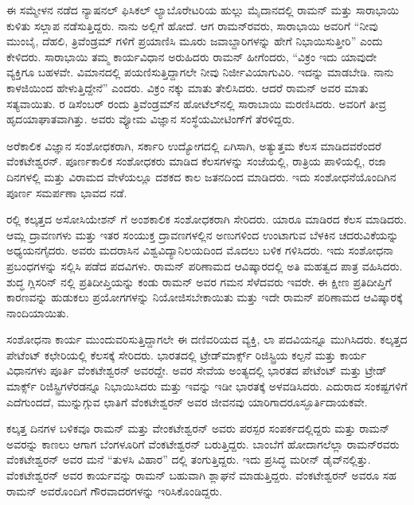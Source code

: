 ಈ ಸಮ್ಮೇಳನ ನಡೆದ ನ್ಯಾಷನಲ್ ಫಿಸಿಕಲ್ ಲ್ಯಾಬೊರೇಟರಿಯ ಹುಲ್ಲು ಮೈದಾನದಲ್ಲಿ ರಾಮನ್ ಮತ್ತು ಸಾರಾಭಾಯಿ ಕುಳಿತು ಸಲ್ಲಾಪ ನಡೆಸುತ್ತಿದ್ದರು. ನಾನು ಅಲ್ಲಿಗೆ ಹೋದೆ. ಆಗ ರಾಮನ್‍ರವರು, ಸಾರಾಭಾಯಿ ಅವರಿಗೆ “ನೀವು ಮುಂಬೈ, ದೆಹಲಿ, ತ್ರಿವೆಂಡ್ರಮ್ ಗಳಿಗೆ ಪ್ರಯಾಣಿಸಿ ಮೂರು ಜವಾಬ್ದಾರಿಗಳನ್ನು ಹೇಗೆ ನಿಭಾಯಿಸುತ್ತೀರಿ” ಎಂದು ಕೇಳಿದರು. ಸಾರಾಭಾಯಿ ತಮ್ಮ ಕಾರ್ಯವಿಧಾನ ಅರುಹಿದರು ರಾಮನ್ ಹೀಗೆಂದರು, “ವಿಕ್ರಂ ಇದು ಯಾವುದೇ ವ್ಯಕ್ತಿಗೂ ಬಹಳವೇ. ವಿಮಾನದಲ್ಲಿ ಪಯಣಿಸುತ್ತಿದ್ದಾಗಲೇ ನೀವು ನಿರ್ಜೀವಿಯಾಗುವಿರಿ. ಇದನ್ನು ಮಾಡಬೇಡಿ. ನಾನು ಕಾಳಜಿಯಿಂದ ಹೇಳುತ್ತಿದ್ದೇನೆ” ಎಂದರು. ವಿಕ್ರಂ ನಕ್ಕು ಮಾತು ತೇಲಿಸಿದರು. ಆದರೆ ರಾಮನ್ ಅವರ ಮಾತು ಸತ್ಯವಾಯಿತು. ರ ಡಿಸೆಂಬರ್ ರಂದು ತ್ರಿವೆಂಡ್ರಮ್‍ನ ಹೋಟೆಲ್‍ನಲ್ಲಿ ಸಾರಾಬಾಯಿ ಮರಣಿಸಿದರು. ಅವರಿಗೆ ತೀವ್ರ ಹೃದಯಾಘಾತವಾಗಿತ್ತು. ಅವರು ವ್ಯೋಮ ವಿಜ್ಞಾನ ಸಂಸ್ಥೆಯ\break ಮೀಟಿಂಗ್‍ಗೆ ತೆರಳಿದ್ದರು.



ಅರೆಕಾಲಿಕ ವಿಜ್ಞಾನ ಸಂಶೋಧಕರಾಗಿ, ಸರ್ಕಾರಿ ಉದ್ಯೋಗದಲ್ಲಿ ಏಗಿಸಾಗಿ, ಅತ್ಯುತ್ತಮ ಕೆಲಸ ಮಾಡಿದವರೆಂದರೆ ವೆಂಕಟೇಶ್ವರನ್. ಪೂರ್ಣಕಾಲಿಕ ಸಂಶೋಧಕರು ಮಾಡಿದ ಕೆಲಸಗಳನ್ನು ಸಂಜೆಯಲ್ಲಿ, ರಾತ್ರಿಯ ಪಾಳಿಯಲ್ಲಿ, ರಜಾ ದಿನಗಳಲ್ಲಿ ಮತ್ತು ವಿರಾಮದ ವೇಳೆಯಲ್ಲೂ ದಶಕದ ಕಾಲ ಜತನದಿಂದ ಮಾಡಿದರು. ಇದು ಸಂಶೋಧನೆಯೊಂದಿಗಿನ ಪೂರ್ಣ ಸಮರ್ಪಣಾ ಭಾವದ ನಡೆ.

ರಲ್ಲಿ ಕಲ್ಕತ್ತದ ಅಸೋಸಿಯೇಶನ್ ಗೆ ಅಂಶಕಾಲಿಕ ಸಂಶೋಧಕರಾಗಿ ಸೇರಿದರು. ಯಾರೂ ಮಾಡಿರದ ಕೆಲಸ ಮಾಡಿದರು. ಆಮ್ಲ ದ್ರಾವಣಗಳು ಮತ್ತು ಇತರ ಸಂಯುಕ್ತ ದ್ರಾವಣಗಳಲ್ಲಿನ ಅಣುಗಳಿಂದ ಉಂಟಾಗುವ ಬೆಳಕಿನ ಚದರುವಿಕೆಯನ್ನು ಅಧ್ಯಯನಗೈದರು. ಅವರು ಮದರಾಸಿನ ವಿಶ್ವವಿದ್ಯಾನಿಲಯದಿಂದ ಮೊದಲು  ಬಳಿಕ  ಗಳಿಸಿದರು. ಇದು ಸಂಶೋಧನಾ ಪ್ರಬಂಧಗಳನ್ನು ಸಲ್ಲಿಸಿ ಪಡೆದ ಪದವಿಗಳು. ರಾಮನ್ ಪರಿಣಾಮದ ಆವಿಷ್ಕಾರದಲ್ಲಿ ಅತಿ ಮಹತ್ವದ ಪಾತ್ರ ವಹಿಸಿದರು. ಶುದ್ಧ ಗ್ಲಿಸರಿನ್ ನಲ್ಲಿ ಪ್ರತಿದೀಪ್ತಿಯನ್ನು ಕಂಡು ರಾಮನ್ ಅವರ ಗಮನ ಸೆಳೆದವರು ಇವರೇ. ಈ ಕ್ಷೀಣ ಪ್ರತಿದೀಪ್ತಿಗೆ ಕಾರಣವನ್ನು ಹುಡುಕಲು ಪ್ರಯೋಗಗಳನ್ನು ನಿಯೋಜಿಸಬೇಕಾಯಿತು ಮತ್ತು ಇದೇ ರಾಮನ್ ಪರಿಣಾಮದ ಆವಿಷ್ಕಾರಕ್ಕೆ ನಾಂದಿಯಾಯಿತು.

ಸಂಶೋಧನಾ ಕಾರ್ಯ ಮುಂದುವರಿಸುತ್ತಿದ್ದಾಗಲೇ ಈ ದಣಿವರಿಯದ ವ್ಯಕ್ತಿ, ಲಾ ಪದವಿ\-ಯನ್ನೂ ಮುಗಿಸಿದರು. ಕಲ್ಕತ್ತದ ಪೇಟೆಂಟ್ ಕಛೇರಿಯಲ್ಲಿ ಕೆಲಸಕ್ಕೆ ಸೇರಿದರು. ಭಾರತದಲ್ಲಿ ಟ್ರೇಡ್‌ಮಾರ್ಕ್ಸ್ ರಿಜಿಸ್ಟ್ರಿಯ ಕಲ್ಪನೆ ಮತ್ತು ಕಾರ್ಯ ವಿಧಾನಗಳು ಪೂರ್ತಿ ವೆಂಕಟೇಶ್ವರನ್ ಅವರದ್ದೇ. ಅವರ ಸೇವೆಯ ಅಂತ್ಯದಲ್ಲಿ ಭಾರತದ ಪೇಟೆಂಟ್ ಮತ್ತು ಟ್ರೇಡ್ ಮಾರ್ಕ್ಸ್ ರಿಜಿಸ್ಟ್ರಿಗಳೆರಡನ್ನೂ ನಿಭಾಯಿಸಿದರು ಮತ್ತು ಇವನ್ನು ಇಡೀ ಭಾರತಕ್ಕೆ ಅಳವಡಿಸಿದರು. ಎದುರಾದ ಸಂಕಷ್ಟಗಳಿಗೆ ಎದೆಗುಂದದೆ, ಮುನ್ನುಗ್ಗುವ ಛಾತಿಗೆ ವೆಂಕಟೇಶ್ವರನ್ ಅವರ ಜೀವನವು ಯಾರಿಗಾದರೂ\break ಸ್ಫೂರ್ತಿದಾಯಕವೇ.

\vskip 2pt

ಕಲ್ಕತ್ತ ದಿನಗಳ ಬಳಿಕವೂ ರಾಮನ್ ಮತ್ತು ವೇಂಕಟೇಶ್ವರನ್ ಅವರು ಪರಸ್ಪರ ಸಂಪರ್ಕದಲ್ಲಿದ್ದರು ಮತ್ತು ರಾಮನ್ ಅವರನ್ನು ಕಾಣಲು ಆಗಾಗ ಬೆಂಗಳೂರಿಗೆ ವೆಂಕಟೇಶ್ವರನ್ ಬರುತ್ತಿದ್ದರು. ಬಾಂಬೆಗೆ ಹೋದಾಗಲೆಲ್ಲಾ ರಾಮನ್‍ರವರು ವೆಂಕಟೇಶ್ವರನ್ ಅವರ ಮನೆ “ತುಳಸಿ ವಿಹಾರ” ದಲ್ಲಿ ತಂಗುತ್ತಿದ್ದರು. ಇದು ಪ್ರಸಿದ್ಧ ಮರೀನ್ ಡೈವ್‍ನಲ್ಲಿತ್ತು. ವೆಂಕಟೇಶ್ವರನ್ ಅವರ ಕಾರ್ಯವನ್ನು ರಾಮನ್ ಬಹುವಾಗಿ ಶ್ಲಾಘನೆ ಮಾಡುತ್ತಿದ್ದರು. ವೆಂಕಟೇಶ್ವರನ್ ಅವರೂ ಸಹ ರಾಮನ್ ಅವರೊಂದಿಗೆ ಗೌರವಾದರಗಳನ್ನು ಇರಿಸಿಕೊಂಡಿದ್ದರು.


